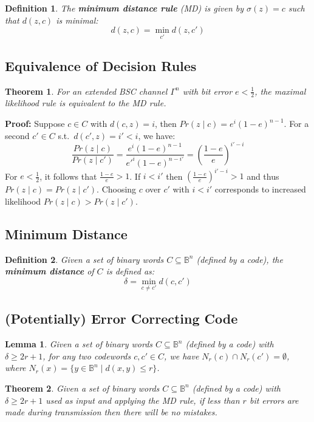 \documentclass[11pt]{article}
\newtheorem{defn}{Definition}
\newtheorem{theo}{Theorem}
\newtheorem{lem}{Lemma}
\begin{document}
\begin{defn}
  The \textbf{minimum distance rule} (MD) is given by $\sigma (z) = c$ such that $d(z, c)$ is minimal:
  \[
    d(z, c) = \min_{c'} d(z, c')
  \]
\end{defn}

\subsection{Equivalence of Decision Rules}
\begin{theo}
  For an extended BSC channel $\Gamma^n$ with bit error $e < \frac{1}{2}$, the maximal likelihood rule is equivalent to the MD rule.
\end{theo}

\textbf{Proof:}
Suppose $c \in C$ with $d(c, z) = i$, then $Pr(z \mid c) = e^i (1 - e)^{n - 1}$.
For a second $c' \in C$ s.t.\ $d(c', z) = i' < i$, we have:
\[
  \frac{Pr(z \mid c)}{Pr(z \mid c')} = \frac{e^i (1 - e)^{n - 1}}{e'^{i} (1 - e)^{n - i'}} = \left(\frac{1 - e}{e}\right)^{i' - i}
\]
For $e < \frac{1}{2}$, it follows that $\frac{1 - e}{e} > 1$.
If $i < i'$ then $(\frac{1 - e}{e})^{i' - i} > 1$ and thus $Pr(z \mid c) = Pr(z \mid c')$.
Choosing $c$ over $c'$ with $i < i'$ corresponds to increased likelihood $Pr(z \mid c) > Pr(z \mid c')$.

\subsection{Minimum Distance}
\begin{defn}
  Given a set of binary words $C \subseteq \mathbb{B}^n$ (defined by a code), the \textbf{minimum distance} of $C$ is defined as:
  \[
    \delta = \min_{c \neq c'} d(c, c')
  \]
\end{defn}

\subsection{(Potentially) Error Correcting Code}
\begin{lem}
  Given a set of binary words $C \subseteq \mathbb{B}^n$ (defined by a code) with $\delta \geq 2r + 1$, for any two codewords $c, c' \in C$, we have $N_r(c) \cap N_r(c') = \emptyset$, where $N_r(x) = \{ y \in \mathbb{B}^n \mid d(x, y) \leq r \}$.
\end{lem}

\begin{theo}
  Given a set of binary words $C \subseteq \mathbb{B}^n$ (defined by a code) with $\delta \geq 2r + 1$ used as input and applying the MD rule, if less than $r$ bit errors are made during transmission then there will be no mistakes.
\end{theo}
\end{document}
